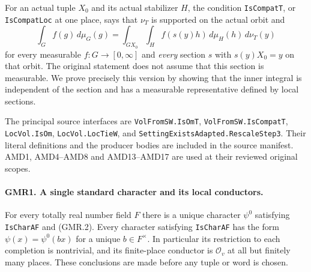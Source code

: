 For an actual tuple $X_0$ and its actual stabilizer $H$, the condition
\texttt{IsCompatT}, or \texttt{IsCompatLoc} at one place, says that
$\nu_T$ is supported on the actual orbit and
\[
 \int_G f(g)\,d\mu_G(g)
  =\int_{G X_0}\int_H f(s(y)h)\,d\mu_H(h)\,d\nu_T(y)
 \tag{GMR.6}
\]
for every measurable $f:G\to[0,\infty]$ and \emph{every} section $s$
with $s(y)X_0=y$ on that orbit.  The original statement does not assume
that this section is measurable.  We prove precisely this version by
showing that the inner integral is independent of the section and has
a measurable representative defined by local sections.

The principal source interfaces are
\texttt{VolFromSW.IsOmT}, \texttt{VolFromSW.IsCompatT},
\texttt{LocVol.IsOm}, \texttt{LocVol.LocTieW}, and
\texttt{SettingExistsAdapted.RescaleStep3}.  Their literal definitions
and the producer bodies are included in the source manifest.  AMD1,
AMD4--AMD8 and AMD13--AMD17 are used at their reviewed original scopes.

\paragraph{GMR1. A single standard character and its local conductors.}
\label{claim:GMR1}
For every totally real number field $F$ there is a unique character
$\psi^0$ satisfying \texttt{IsCharAF} and (GMR.2).
Every character satisfying \texttt{IsCharAF} has the form
$\psi(x)=\psi^0(bx)$ for a unique $b\in F^\times$.
In particular its restriction to each completion is nontrivial, and
its finite-place conductor is $\mathcal O_v$ at all but finitely many
places.  These conclusions are made before any tuple or word is chosen.

